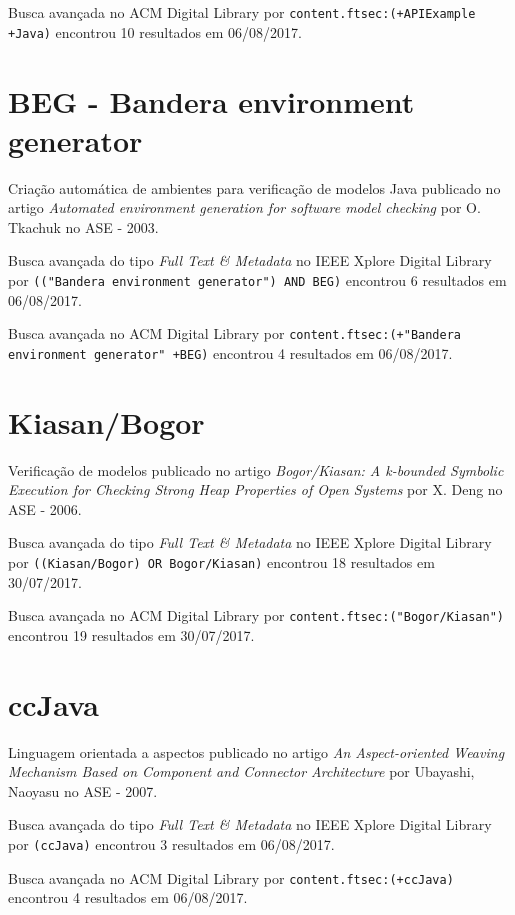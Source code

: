 Busca avançada no ACM Digital Library por
\texttt{content.ftsec:(+APIExample +Java)}
encontrou
10 resultados em
06/08/2017.

\section{BEG - Bandera environment generator}

Criação automática de ambientes para verificação de modelos Java
publicado no artigo
{\it Automated environment generation for software model checking}
por
O. Tkachuk
no
ASE
-
2003.

Busca avançada do tipo {\it Full Text \& Metadata} no IEEE Xplore Digital Library por
\texttt{(("Bandera environment generator") AND BEG)}
encontrou
6 resultados em
06/08/2017.

Busca avançada no ACM Digital Library por
\texttt{content.ftsec:(+"Bandera environment generator" +BEG)}
encontrou
4 resultados em
06/08/2017.

\section{Kiasan/Bogor}

Verificação de modelos
publicado no artigo
{\it Bogor/Kiasan: A k-bounded Symbolic Execution for Checking Strong Heap Properties of Open Systems}
por
X. Deng
no
ASE
-
2006.

Busca avançada do tipo {\it Full Text \& Metadata} no IEEE Xplore Digital Library por
\texttt{((Kiasan/Bogor) OR Bogor/Kiasan)}
encontrou
18 resultados em
30/07/2017.

Busca avançada no ACM Digital Library por
\texttt{content.ftsec:("Bogor/Kiasan")}
encontrou
19 resultados em
30/07/2017.

\section{ccJava}

Linguagem orientada a aspectos
publicado no artigo
{\it An Aspect-oriented Weaving Mechanism Based on Component and Connector Architecture}
por
Ubayashi, Naoyasu
no
ASE
-
2007.

Busca avançada do tipo {\it Full Text \& Metadata} no IEEE Xplore Digital Library por
\texttt{(ccJava)}
encontrou
3 resultados em
06/08/2017.

Busca avançada no ACM Digital Library por
\texttt{content.ftsec:(+ccJava)}
encontrou
4 resultados em
06/08/2017.

